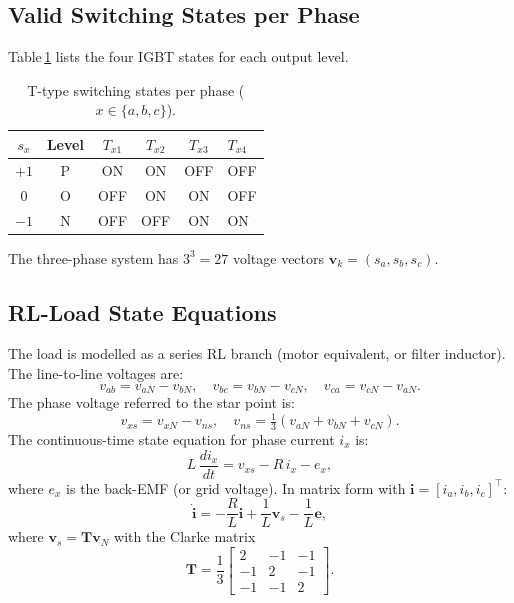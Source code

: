\documentclass[11pt,a4paper]{article}
\begin{document}
\subsection{Valid Switching States per Phase}
\label{sec:states}

Table\,\ref{tab:states} lists the four IGBT states for each output level.

\begin{table}[htbp]
  \centering
  \caption{T-type switching states per phase ($x\in\{a,b,c\}$).}
  \label{tab:states}
  \begin{tabular}{cccccl}
    \toprule
    $s_x$ & Level & $T_{x1}$ & $T_{x2}$ & $T_{x3}$ & $T_{x4}$ \\
    \midrule
    $+1$ & P & ON  & ON  & OFF & OFF \\
    $ 0$ & O & OFF & ON  & ON  & OFF \\
    $-1$ & N & OFF & OFF & ON  & ON  \\
    \bottomrule
  \end{tabular}
\end{table}

The three-phase system has $3^3 = 27$ voltage vectors $\bm{v}_k
= (s_a,s_b,s_c)$.

\subsection{RL-Load State Equations}
\label{sec:rl}

The load is modelled as a series RL branch (motor equivalent, or filter
inductor).  The line-to-line voltages are:
\begin{equation}
  v_{ab} = v_{aN} - v_{bN}, \quad
  v_{bc} = v_{bN} - v_{cN}, \quad
  v_{ca} = v_{cN} - v_{aN}.
\end{equation}
The phase voltage referred to the star point is:
\begin{equation}
  v_{xs} = v_{xN} - v_{ns}, \quad
  v_{ns} = \tfrac{1}{3}(v_{aN}+v_{bN}+v_{cN}).
\end{equation}
The continuous-time state equation for phase current $i_x$ is:
\begin{equation}
  L\,\frac{d i_x}{dt} = v_{xs} - R\,i_x - e_x,
  \label{eq:ct}
\end{equation}
where $e_x$ is the back-EMF (or grid voltage).  In matrix form with
$\bm{i} = [i_a,i_b,i_c]^{\top}$:
\begin{equation}
  \dot{\bm{i}} = -\frac{R}{L}\bm{i} + \frac{1}{L}\bm{v}_s - \frac{1}{L}\bm{e},
  \label{eq:ss}
\end{equation}
where $\bm{v}_s = \mathbf{T}\bm{v}_N$ with the Clarke matrix
\begin{equation}
  \mathbf{T} = \frac{1}{3}\begin{bmatrix}
    2 & -1 & -1 \\ -1 & 2 & -1 \\ -1 & -1 & 2
  \end{bmatrix}.
\end{equation}
\end{document}
